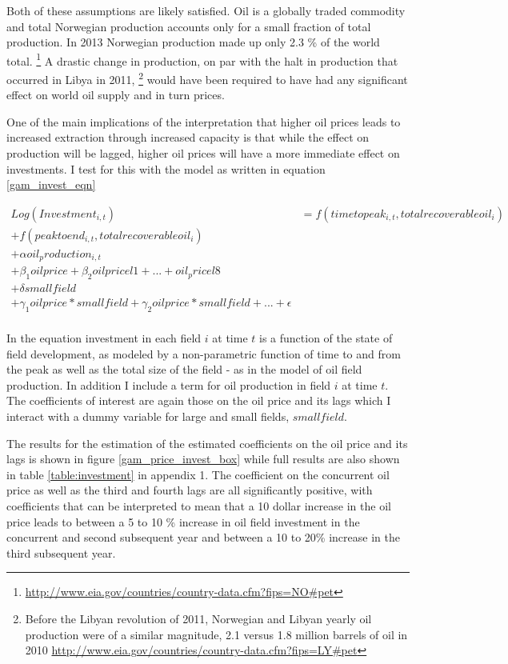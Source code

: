 \documentclass[12pt]{article}
\begin{document}
Both of these assumptions are likely satisfied.  Oil is a globally traded commodity and total Norwegian production accounts only for a small fraction of total production.  In 2013 Norwegian production made up only 2.3 \% of the world total. \footnote{\url{http://www.eia.gov/countries/country-data.cfm?fips=NO#pet}}  A drastic change in production, on par with the halt in production that occurred in Libya in 2011, \footnote{Before the Libyan revolution of 2011, Norwegian and Libyan yearly oil production were of a similar magnitude, 2.1 versus 1.8 million barrels of oil in 2010 \url{http://www.eia.gov/countries/country-data.cfm?fips=LY#pet}} would have been required to have had any significant effect on world oil supply and in turn prices. 

One of the main implications of the interpretation that higher oil prices leads to increased extraction through increased capacity is that while the effect on production will be lagged, higher oil prices will have a more immediate effect on investments.  I test for this with the model as written in equation \ref{gam_invest_eqn}

\begin{multline}
	Log(Investment_{i,t})&=f(timetopeak_{i,t}, totalrecoverableoil_i) \\
	+ f(peaktoend_{i,t}, totalrecoverableoil_i) \\
	+ \alpha oil_production_{i,t} \\
	 + \beta_1 oilprice + \beta_2 oilpricel1 + ... + oil_pricel8 \\
	+ \delta smallfield \\
	+ \gamma_1 oilprice*smallfield + \gamma_2 oilprice*smallfield + ... 
	+  \epsilon \\
\label{gam_invest_eqn}
\end{multline}

In the equation investment in each field $i$ at time $t$ is a function of the state of field development, as modeled by a non-parametric function of time to and from the peak as well as the total size of the field - as in the model of oil field production.  In addition I include a term for oil production in field $i$ at time $t$.  The coefficients of interest are again those on the oil price and its lags which I interact with a dummy variable for large and small fields, $smallfield$.

The results for the estimation of the estimated coefficients on the oil price and its lags is shown in figure \ref{gam_price_invest_box} while full results are also shown in table \ref{table:investment} in appendix 1.  The coefficient on the concurrent oil price as well as the third and fourth lags are all significantly positive, with coefficients that can be interpreted to mean that a 10 dollar increase in the oil price leads to between a 5 to 10 \% increase in oil field investment in the concurrent and second subsequent year and between a 10 to 20\% increase in the third subsequent year.  
\end{document}
